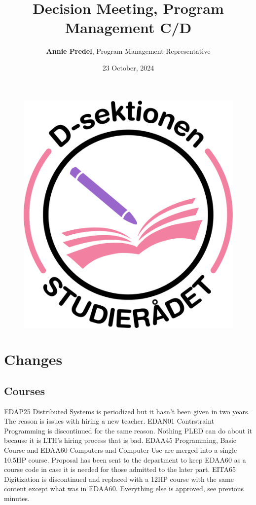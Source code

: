\documentclass{article}
\begin{document}
	\begin{figure}[t]
		\vspace{-60pt}
		\includegraphics[width= 32 mm, center]{SRDDark.png}
	\end{figure}
	
	\title{\vspace{-30pt}Decision Meeting, Program Management C/D}
	\author{\textbf{Annie Predel}, Program Management Representative}
	\date{23 October, 2024}
	
	\maketitle
	
	
	
	
	\section{Changes}
	\subsection{Courses}
	EDAP25 Distributed Systems is periodized but it hasn't been given in two years. The reason is issues with hiring a new teacher.\newline
	EDAN01 Contrstraint Programming is discontinued for the same reason. Nothing PLED can do about it because it is LTH's hiring process that is bad.\newline
	EDAA45 Programming, Basic Course and EDAA60 Computers and Computer Use are merged into a single 10.5HP course. Proposal has been sent to the department to keep EDAA60 as a course code in case it is needed for those admitted to the later part.\newline
	EITA65 Digitization is discontinued and replaced with a 12HP course with the same content except what was in EDAA60.\newline
	Everything else is approved, see previous minutes.
	
\end{document}

